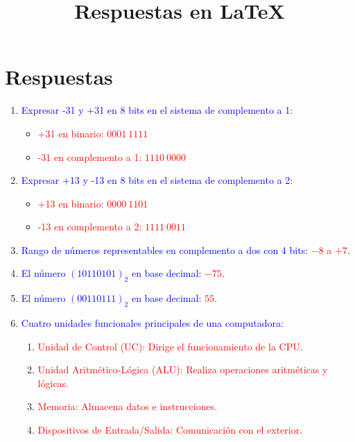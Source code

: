 \documentclass{article}
\begin{document}
\title{Respuestas en LaTeX}
\author{}
\date{}

\maketitle

\section*{Respuestas}

\begin{enumerate}
    \item \textcolor{blue}{Expresar -31 y +31 en 8 bits en el sistema de complemento a 1:}
    \begin{itemize}
        \item \textcolor{red}{+31 en binario: \(0001\ 1111\)}
        \item \textcolor{red}{-31 en complemento a 1: \(1110\ 0000\)}
    \end{itemize}
    
    \item \textcolor{blue}{Expresar +13 y -13 en 8 bits en el sistema de complemento a 2:}
    \begin{itemize}
        \item \textcolor{red}{+13 en binario: \(0000\ 1101\)}
        \item \textcolor{red}{-13 en complemento a 2: \(1111\ 0011\)}
    \end{itemize}
    
    \item \textcolor{blue}{Rango de números representables en complemento a dos con 4 bits:} \textcolor{red}{\(-8\) a \(+7\)}.
    
    \item \textcolor{blue}{El número \((10110101)_2\) en base decimal:} \textcolor{red}{\(-75\)}.
    
    \item \textcolor{blue}{El número \((00110111)_2\) en base decimal:} \textcolor{red}{\(55\)}.
    
    \item \textcolor{blue}{Cuatro unidades funcionales principales de una computadora:}
    \begin{enumerate}
        \item \textcolor{red}{Unidad de Control (UC): Dirige el funcionamiento de la CPU.}
        \item \textcolor{red}{Unidad Aritmético-Lógica (ALU): Realiza operaciones aritméticas y lógicas.}
        \item \textcolor{red}{Memoria: Almacena datos e instrucciones.}
        \item \textcolor{red}{Dispositivos de Entrada/Salida: Comunicación con el exterior.}
    \end{enumerate}
    

\end{enumerate}
\end{document}
